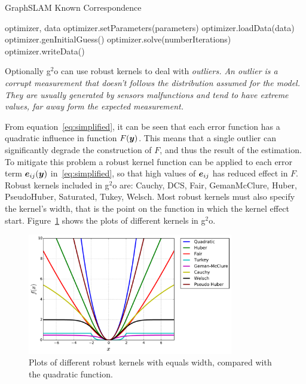 \begin{algorithm}[htbp!]
    \caption{GraphSLAM Known Correspondence}
    \label{alg:known-correspondence}
    \begin{algorithmic}[1]
        \Require optimizer, data
        \State optimizer.setParameters(parameters)
        \State optimizer.loadData(data)
        \State optimizer.genInitialGuess()
        \State optimizer.solve(numberIterations)
        \State optimizer.writeData()
    \end{algorithmic}
\end{algorithm}

Optionally g$^2$o can use robust kernels to deal with \it{outliers}. An outlier is a corrupt measurement that doesn't follows the distribution assumed for the model. They are usually generated by sensors malfunctions and tend to have extreme values, far away form the expected measurement. 

From equation~\eqref{eq:simplified}, it can be seen that each error function has a quadratic influence in function $F(\boldsymbol{y})$. This means that a single outlier can significantly degrade the construction of $F$, and thus the result of the estimation. To mitigate this problem a robust kernel function can be applied to each error term $\boldsymbol{e}_{ij}(\boldsymbol{y})$ in~\eqref{eq:simplified}, so that high values of $\boldsymbol{e}_{ij}$ has reduced effect in $F$. Robust kernels included in g$^2$o are: Cauchy, DCS, Fair, GemanMcClure, Huber, PseudoHuber, Saturated, Tukey, Welsch. Most robust kernels must also specify the kernel's width, that is the point on the function in which the kernel effect start. Figure~\ref{fig:kernels} shows the plots of different kernels in g$^2$o. 

\begin{figure}[htbp!]
    \centering
    \includegraphics[width=0.8\textwidth]{imagenes/kernels.pdf}
    \caption[Plots of different kernels.]{Plots of different robust kernels with equals width, compared with the quadratic function.}
    \label{fig:kernels}
\end{figure}

